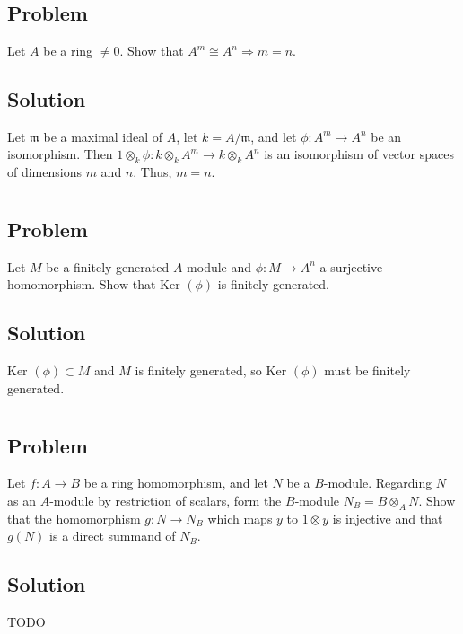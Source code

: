 \documentclass[book,12pt,oneside,openany]{memoir}
\begin{document}
\section{}
\subsection{Problem}
Let $A$ be a ring $\neq 0$. Show that $A^m \cong A^n \Rightarrow m = n$.

\subsection{Solution}
Let $\mathfrak{m}$ be a maximal ideal of $A$, let $k = A/\mathfrak{m}$, and let $\phi: A^m \rightarrow A^n$ be an isomorphism. Then $1 \otimes_k \phi: k \otimes_k A^m \rightarrow k \otimes_k A^n$ is an isomorphism of vector spaces of dimensions $m$ and $n$. Thus, $m = n$.

\section{}
\subsection{Problem}
Let $M$ be a finitely generated $A$-module and $\phi: M \rightarrow A^n$ a surjective homomorphism. Show that Ker $(\phi)$ is finitely generated.

\subsection{Solution}
Ker $(\phi) \subset M$ and $M$ is finitely generated, so Ker $(\phi)$ must be finitely generated.

\section{}
\subsection{Problem}
Let $f: A \rightarrow B$ be a ring homomorphism, and let $N$ be a $B$-module. Regarding $N$ as an $A$-module by restriction of scalars, form the $B$-module $N_B = B \otimes_A N$. Show that the homomorphism $g: N \rightarrow N_B$ which maps $y$ to $1 \otimes y$ is injective and that $g(N)$ is a direct summand of $N_B$.

\subsection{Solution}
TODO
\end{document}
